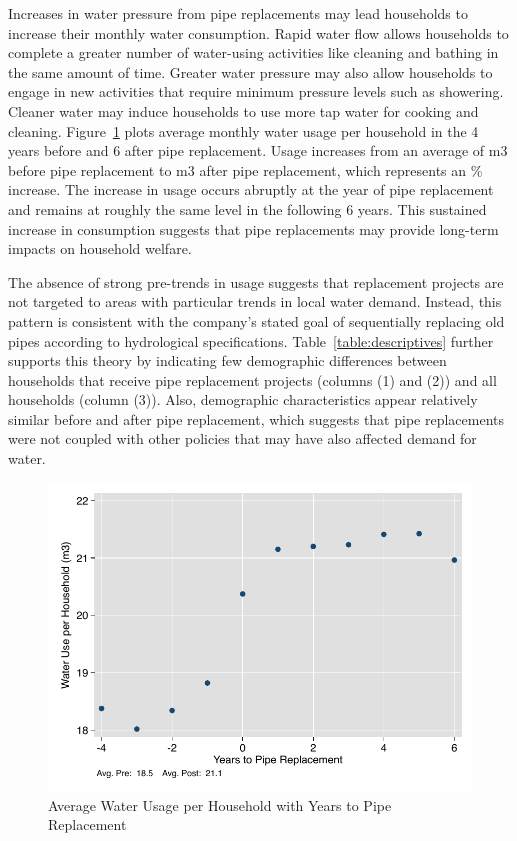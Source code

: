 \documentclass[12pt,table]{article}
\begin{document}
Increases in water pressure from pipe replacements may lead households to increase their monthly water consumption.  Rapid water flow allows households to complete a greater number of water-using activities like cleaning and bathing in the same amount of time.  Greater water pressure may also allow households to engage in new activities that require minimum pressure levels such as showering.  Cleaner water may induce households to use more tap water for cooking and cleaning.  Figure~\ref{figure:pipecons} plots average monthly water usage per household in the 4 years before and 6 after pipe replacement.  Usage increases from an average of m3 before pipe replacement to m3 after pipe replacement, which represents an \unskip\% increase.  The increase in usage occurs abruptly at the year of pipe replacement and remains at roughly the same level in the following 6 years.  This sustained increase in consumption suggests that pipe replacements may provide long-term impacts on household welfare.  

The absence of strong pre-trends in usage suggests that replacement projects are not targeted to areas with particular trends in local water demand.  Instead, this pattern is consistent with the company's stated goal of sequentially replacing old pipes according to hydrological specifications.  Table~\ref{table:descriptives} further supports this theory by indicating few demographic differences between households that receive pipe replacement projects (columns (1) and (2)) and all households (column (3)).  Also, demographic characteristics appear relatively similar before and after pipe replacement, which suggests that pipe replacements were not coupled with other policies that may have also affected demand for water.  

\begin{figure}
\begin{center}
\caption{Average Water Usage per Household with Years to Pipe Replacement}\label{figure:pipecons}
\includegraphics[scale=1]{tables/pipe_cons.pdf}
\end{center}
\end{figure}
\end{document}

